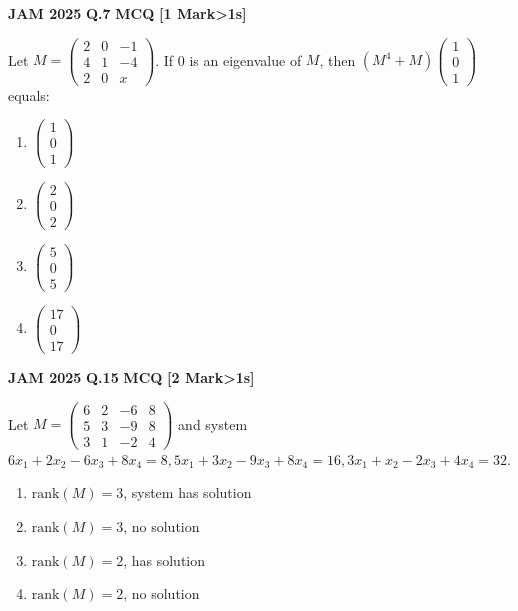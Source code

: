 \documentclass[11pt,a4paper]{article}
\newcommand{\pyqheader}[4]{%
    \noindent\begin{tcolorbox}[
        colback=badgebg,
        colframe=secondary,
        arc=2mm,
        boxrule=0.6pt,
        top=1.5mm,bottom=1.5mm,left=2mm,right=2mm
    ]
        \textbf{\textcolor{primary}{JAM #1}} \hfill \textbf{Q.#2} \hfill \textsc{\textbf{#3}} \hfill \textbf{[#4 Mark\ifnum#4>1s\fi]}
    \end{tcolorbox}\vspace{-1mm}
}
\begin{document}
\pyqheader{2025}{7}{MCQ}{1}
Let $M=\begin{pmatrix}2&0&-1\\ 4&1&-4\\ 2&0&x\end{pmatrix}$. If 0 is an eigenvalue of $M$, then $(M^{4}+M)\begin{pmatrix}1\\ 0\\ 1\end{pmatrix}$ equals:
\begin{enumerate}[label=(\Alph*)]
    \item $\begin{pmatrix}1\\ 0\\ 1\end{pmatrix}$
    \item $\begin{pmatrix}2\\ 0\\ 2\end{pmatrix}$
    \item $\begin{pmatrix}5\\ 0\\ 5\end{pmatrix}$
    \item $\begin{pmatrix}17\\ 0\\ 17\end{pmatrix}$
\end{enumerate}

\pyqheader{2025}{15}{MCQ}{2}
Let $M=\begin{pmatrix}6&2&-6&8\\ 5&3&-9&8\\ 3&1&-2&4\end{pmatrix}$ and system $6x_1+2x_2-6x_3+8x_4=8, 5x_1+3x_2-9x_3+8x_4=16, 3x_1+x_2-2x_3+4x_4=32$.
\begin{enumerate}[label=(\Alph*)]
    \item $\text{rank}(M)=3$, system has solution
    \item $\text{rank}(M)=3$, no solution
    \item $\text{rank}(M)=2$, has solution
    \item $\text{rank}(M)=2$, no solution
\end{enumerate}
\end{document}
